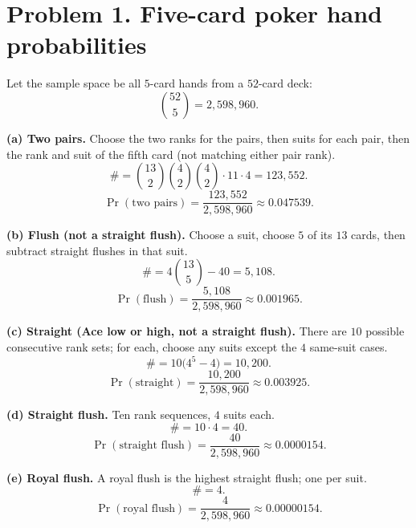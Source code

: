 \section*{Problem 1. Five-card poker hand probabilities}

Let the sample space be all $5$-card hands from a $52$-card deck:
\[
\binom{52}{5}=2{,}598{,}960.
\]

\textbf{(a) Two pairs.}
Choose the two ranks for the pairs, then suits for each pair, then the rank and suit of the fifth card (not matching either pair rank).
\[
\#=\binom{13}{2}\binom{4}{2}\binom{4}{2}\cdot 11\cdot 4
=123{,}552.
\]
\[
\Pr(\text{two pairs})=\dfrac{123{,}552}{2{,}598{,}960}\approx 0.047539.
\]

\textbf{(b) Flush (not a straight flush).}
Choose a suit, choose $5$ of its $13$ cards, then subtract straight flushes in that suit.
\[
\#=4\binom{13}{5}-40=5{,}108.
\]
\[
\Pr(\text{flush})=\dfrac{5{,}108}{2{,}598{,}960}\approx 0.001965.
\]

\textbf{(c) Straight (Ace low or high, not a straight flush).}
There are $10$ possible consecutive rank sets; for each, choose any suits except the $4$ same-suit cases.
\[
\#=10\bigl(4^5-4\bigr)=10{,}200.
\]
\[
\Pr(\text{straight})=\dfrac{10{,}200}{2{,}598{,}960}\approx 0.003925.
\]

\textbf{(d) Straight flush.}
Ten rank sequences, $4$ suits each.
\[
\#=10\cdot 4=40.
\]
\[
\Pr(\text{straight flush})=\dfrac{40}{2{,}598{,}960}\approx 0.0000154.
\]

\textbf{(e) Royal flush.}
A royal flush is the highest straight flush; one per suit.
\[
\#=4.
\]
\[
\Pr(\text{royal flush})=\dfrac{4}{2{,}598{,}960}\approx 0.00000154.
\]
